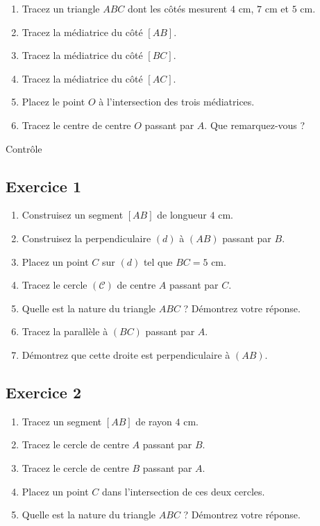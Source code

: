 \documentclass[12 pt]{extarticle}
\theoremstyle{plain}
\begin{document}
 \begin{enumerate}
 \item Tracez un triangle $ABC$ dont les côtés mesurent $4$ cm, $7$ cm et $5$ cm. 
 \item Tracez la médiatrice du côté $[AB]$. 
 \item Tracez la médiatrice du côté $[BC]$. 
 \item Tracez la médiatrice du côté $[AC]$. 
 \item Placez le point $O$ à l'intersection des trois médiatrices. 
 \item Tracez le centre de centre $O$ passant par $A$. Que remarquez-vous ? \end{enumerate}
 

\newpage

\begin{center}{\Large Contrôle}\\ 
 \end{center}
 
 \subsection*{Exercice 1}
 \begin{enumerate}
 \item Construisez un segment $[AB]$ de longueur $4$ cm. 
 
 
 \item Construisez la perpendiculaire $(d)$ à $(AB)$ passant par $B$.  
 \item Placez un point $C$ sur $(d)$ tel que $BC=5$ cm. 
	
 \item Tracez le cercle $(\mathcal C)$ de centre $A$ passant par $C$.
 
 \item Quelle est la nature du triangle $ABC$ ? Démontrez votre réponse. 
 
 \item Tracez la parallèle à $(BC)$ passant par $A$. 
 
 \item Démontrez que cette droite est perpendiculaire à $(AB)$. 
 
 
 \end{enumerate}
 \subsection*{Exercice 2}
 
 \begin{enumerate}
 \item Tracez un segment $[AB]$ de rayon $4$ cm. 
 
 \item Tracez le cercle de centre $A$ passant par $B$. 
 
 \item Tracez le cercle de centre $B$ passant par $A$. 
 
 \item Placez un point $C$ dans l'intersection de ces deux cercles. 
 
 \item Quelle est la nature du triangle $ABC$ ? Démontrez votre réponse. 
 \end{enumerate}
 
\end{document}
